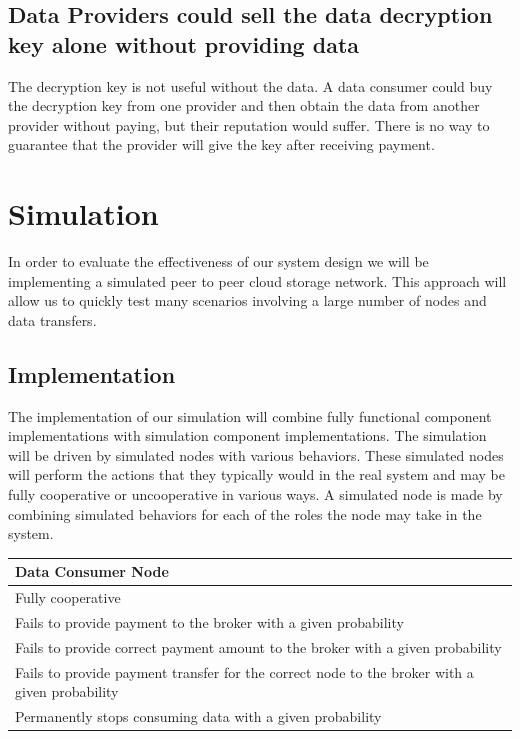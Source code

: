 \documentclass[%
				10pt,
        final,
        notitlepage,
        narroweqnarray,
        inline,
        twoside,
        ]{ieee}
\begin{document}
\subsection{Data Providers could sell the data decryption key alone without providing data}
The decryption key is not useful without the data. A data consumer could buy the decryption key from one provider and then obtain the data from another provider without paying, but their reputation would suffer.  There is no way to guarantee that the provider will give the key after receiving payment.

\section{Simulation}
In order to evaluate the effectiveness of our system design we will be implementing a simulated peer to peer cloud storage network.  This approach will allow us to quickly test many scenarios involving a large number of nodes and data transfers. 

\subsection{Implementation}
The implementation of our simulation will combine fully functional component implementations with simulation component implementations.  The simulation will be driven by simulated nodes with various behaviors.  These simulated nodes will perform the actions that they typically would in the real system and may be fully cooperative or uncooperative in various ways.  A simulated node is made by combining simulated behaviors for each of the roles the node may take in the system.

\begin{center}
  \begin{tabular}{ p{6.25cm} }
    \bf Data Consumer Node \\ \hline
    \hline
    Fully cooperative \\ \hline
    Fails to provide payment to the broker with a given probability \\ \hline
    Fails to provide correct payment amount to the broker with a given probability \\ \hline
    Fails to provide payment transfer for the correct node to the broker with a given probability \\ \hline
    Permanently stops consuming data with a given probability \\
    \hline
  \end{tabular}
\end{center}
\end{document}
